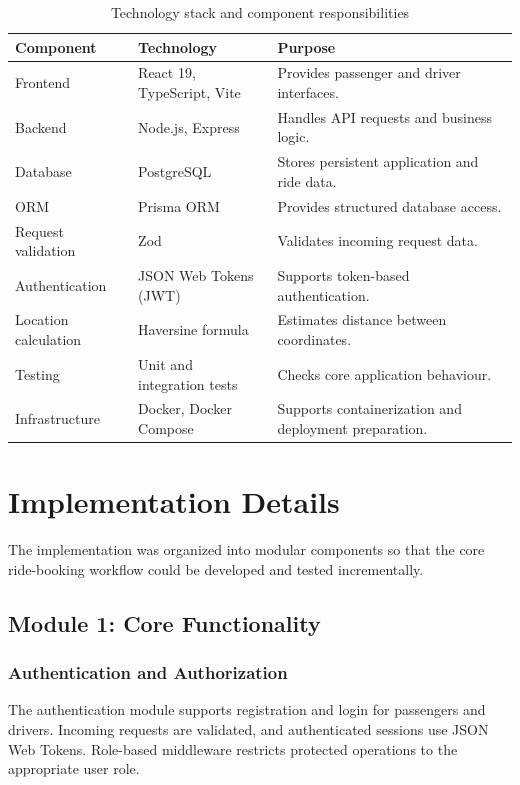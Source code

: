 \documentclass{tietreport}
\begin{document}
\begin{table}[H]
\centering
\small
\renewcommand{\arraystretch}{1.25}
\begin{tabularx}{\textwidth}{p{} p{} X}
\toprule
\textbf{Component} & \textbf{Technology} & \textbf{Purpose} \\
\midrule
Frontend & React 19, TypeScript, Vite & Provides passenger and driver interfaces. \\
Backend & Node.js, Express & Handles API requests and business logic. \\
Database & PostgreSQL & Stores persistent application and ride data. \\
ORM & Prisma ORM & Provides structured database access. \\
Request validation & Zod & Validates incoming request data. \\
Authentication & JSON Web Tokens (JWT) & Supports token-based authentication. \\
Location calculation & Haversine formula & Estimates distance between coordinates. \\
Testing & Unit and integration tests & Checks core application behaviour. \\
Infrastructure & Docker, Docker Compose & Supports containerization and deployment preparation. \\
\bottomrule
\end{tabularx}
\caption{Technology stack and component responsibilities}
\label{tab:techstack}
\end{table}

\section{Implementation Details}

The implementation was organized into modular components so
that the core ride-booking workflow could be developed and
tested incrementally.

\subsection{Module 1: Core Functionality}

\subsubsection*{Authentication and Authorization}

The authentication module supports registration and login
for passengers and drivers. Incoming requests are validated,
and authenticated sessions use JSON Web Tokens. Role-based
middleware restricts protected operations to the appropriate
user role.
\end{document}
